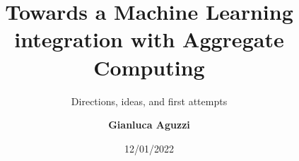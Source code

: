 

\title{{\playfairblack Towards a Machine Learning integration with Aggregate Computing}}
\subtitle{Directions, ideas, and first attempts}
\author[G.Aguzzi]{
  \textbf{Gianluca Aguzzi}
}
\talk{ }

\date{ 12/01/2022 }
